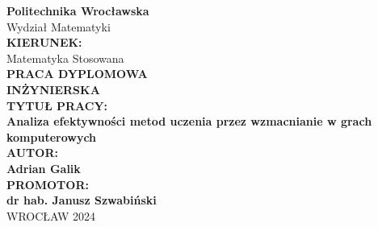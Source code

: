 \documentclass[a4paper, 12pt]{article}
\numberwithin{equation}{section}
\begin{document}
    \thispagestyle{empty}

    \begin{center}
        \textbf{\LARGE Politechnika Wrocławska} \\[1em]
        \Large Wydział Matematyki \\[2em]

        \textbf{KIERUNEK:} \\
        \Large Matematyka Stosowana \\[2em]

        \textbf{\LARGE PRACA DYPLOMOWA \\[0.5em] INŻYNIERSKA} \\[6em]

        \textbf{\large TYTUŁ PRACY:} \\[1em]
        \textbf{\Large Analiza efektywności metod uczenia przez wzmacnianie w grach komputerowych} \\[2em]

        \textbf{\large AUTOR:} \\[1em]
        \textbf{\Large Adrian Galik} \\[2em]

        \textbf{\large PROMOTOR:} \\[1em]
        \textbf{\Large dr hab. Janusz Szwabiński } \\[10em]

        WROCŁAW 2024
    \end{center}

    \newpage
\end{document}
